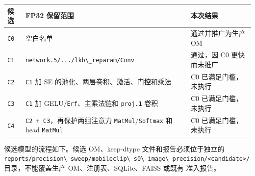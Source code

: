\begin{longtable}[]{@{}
  >{\raggedright\arraybackslash}p{}
  >{\raggedright\arraybackslash}p{}
  >{\raggedright\arraybackslash}p{}@{}}
\toprule\noalign{}
\begin{minipage}[b]{\linewidth}\raggedright
候选
\end{minipage} & \begin{minipage}[b]{\linewidth}\raggedright
FP32 保留范围
\end{minipage} & \begin{minipage}[b]{\linewidth}\raggedright
本次结果
\end{minipage} \\
\midrule\noalign{}
\endhead
\bottomrule\noalign{}
\endlastfoot
\passthrough{\lstinline!C0!} & 空白名单 & 通过并推广为生产 OM \\
\passthrough{\lstinline!C1!} &
\passthrough{\lstinline!network.5/.../lkb\_reparam/Conv!} & 通过，因 C0
更快而未推广 \\
\passthrough{\lstinline!C2!} & \passthrough{\lstinline!C1!} 加 SE
的池化、两层卷积、激活、门控和乘法 & C0 已满足门槛，未执行 \\
\passthrough{\lstinline!C3!} & \passthrough{\lstinline!C1!} 加
GELU/\passthrough{\lstinline!Erf!}、主乘法链和
\passthrough{\lstinline!proj.1!} 卷积 & C0 已满足门槛，未执行 \\
\passthrough{\lstinline!C4!} &
\passthrough{\lstinline!C2 + C3!}，再保护两组注意力
\passthrough{\lstinline!MatMul!}/\passthrough{\lstinline!Softmax!} 和
head \passthrough{\lstinline!MatMul!} & C0 已满足门槛，未执行 \\
\end{longtable}

候选模型的流程如下。候选 OM、keep-dtype 文件和报告必须位于独立的
\passthrough{\lstinline!reports/precision\_sweep/mobileclip\_s0\_image\_precision/<candidate>/!}
目录，不能覆盖生产 OM、注册表、SQLite、FAISS 或既有 准入报告。

